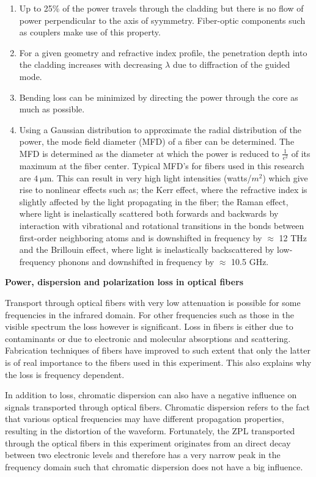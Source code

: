 \begin{enumerate}
\item{Up to 25\% of the power travels through the cladding but there is no flow of power perpendicular to the axis of syymmetry. Fiber-optic components such as couplers make use of this property.}
\item{For a given geometry and refractive index profile, the penetration depth into the cladding increases with decreasing $\lambda$ due to diffraction of the guided mode.}
\item{Bending loss can be minimized by directing the power through the core as much as possible.}
\item{Using a Gaussian distribution to approximate the radial distribution of the power, the mode field diameter (MFD) of a fiber can be determined. The MFD is determined as the diameter at which the power is reduced to $\frac{1}{e^2}$ of its maximum at the fiber center. Typical MFD's for fibers used in this research are $4 \: \mathrm{\mu m}$. This can result in very high light intensities (watts/$m^2$) which give rise to nonlinear effects such as; the Kerr effect, where the refractive index is slightly affected by the light propagating in the fiber; the Raman effect, where light is inelastically scattered both forwards and backwards by interaction with vibrational and rotational transitions in the bonds between first-order neighboring atoms and is downshifted in frequency by $\approx$ 12 THz and the Brillouin effect, where light is inelastically backscattered by low-frequency phonons and downshifted in frequency by $\approx$ 10.5 GHz.} 
\end{enumerate}
{\raggedright\color{color1}\textbf{Power, dispersion and polarization loss in optical fibers}}
Transport through optical fibers with very low attenuation is possible for some frequencies in the infrared domain. For other frequencies such as those in the visible spectrum the loss however is significant. Loss in fibers is either due to contaminants or due to electronic and molecular absorptions and scattering. Fabrication techniques of fibers have improved to such extent that only the latter is of real importance to the fibers used in this experiment. This also explains why the loss is frequency dependent. 

In addition to loss, chromatic dispersion can also have a negative influence on signals transported through optical fibers. Chromatic dispersion refers to the fact that various optical frequencies may have different propagation properties, resulting in the distortion of the waveform. Fortunately, the ZPL transported through the optical fibers in this experiment originates from an direct decay between two electronic levels and therefore has a very narrow peak in the frequency domain such that chromatic dispersion does not have a big influence.


